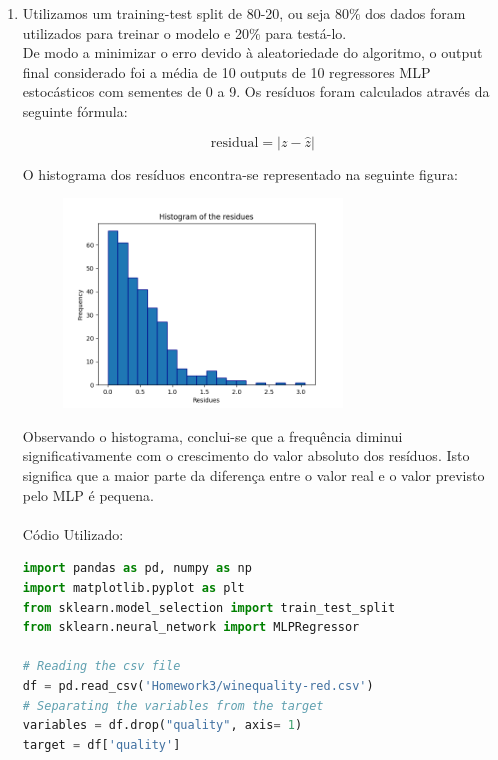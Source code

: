 \documentclass[a4paper,12pt]{article} %
\begin{document}
\begin{enumerate}

\item Utilizamos um training-test split de 80-20, ou seja 80\% dos dados foram utilizados para treinar o modelo e 20\% para testá-lo.\\ 
De modo a minimizar o erro devido à aleatoriedade do algoritmo, o output final considerado foi a média de 10 outputs de 10 regressores MLP estocásticos com sementes de 0 a 9.
Os resíduos foram calculados através da seguinte fórmula:

\begin{equation}
    \text{residual} = | z - \hat{z} |
\end{equation}

O histograma dos resíduos encontra-se representado na seguinte figura:

\begin{figure}[H]
    \centering
    \includegraphics[width=0.7\textwidth]{ex1_histogram.png}
\end{figure}

Observando o histograma, conclui-se que a frequência diminui significativamente 
com o crescimento do valor absoluto dos resíduos. Isto significa que a maior parte
da diferença entre o valor real e o valor previsto pelo MLP é pequena.\\ \\

Códio Utilizado:

\begin{lstlisting}[language=Python]
import pandas as pd, numpy as np
import matplotlib.pyplot as plt
from sklearn.model_selection import train_test_split
from sklearn.neural_network import MLPRegressor

# Reading the csv file
df = pd.read_csv('Homework3/winequality-red.csv')
# Separating the variables from the target
variables = df.drop("quality", axis= 1)
target = df['quality']


\end{lstlisting}
\end{enumerate}
\end{document}
